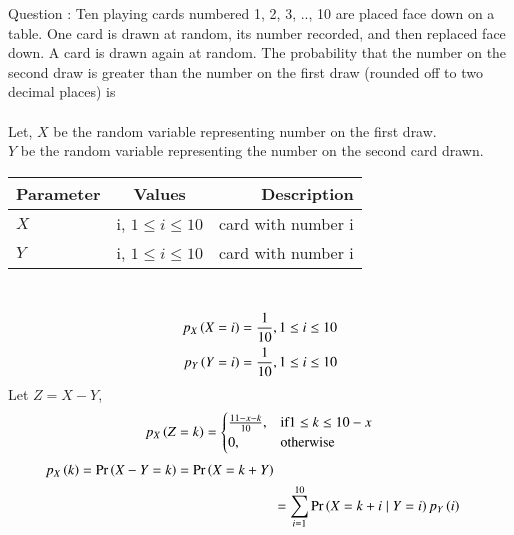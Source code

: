 \documentclass[journal,12pt,onecolumn]{IEEEtran}
\theoremstyle{remark}
\begin{document}
\let\vec\mathbf




\vspace{3cm}



\bigskip

\renewcommand{\thefigure}{\theenumi}
\renewcommand{\thetable}{\theenumi}
Question : Ten playing cards numbered 1, 2, 3, .., 10 are placed face down on a table. One card is drawn at random, its number recorded, and then replaced face down. A card is drawn again at random. The probability that the number on the second draw is greater than the number on the first draw (rounded off to two decimal places) is\\
\solution\\
Let, $X$ be the random variable representing number on the first draw.\\
$Y$ be the random variable representing the number on the second card drawn.\\
\begin{table}[h!]
 \begin{center}
    \begin{tabular}{|l|c|r|}
    \hline
    Parameter & Values & Description\\
    \hline
    $X$ & i, $1 \le i \le 10$ & card with number i\\
    \hline
     $Y$ & i, $1 \le i \le 10$ & card with number i\\
    \hline
    \end{tabular}
    \end{center}
  \label{tab:BT/61} 
\end{table}\\
\begin{align}
p_X\left(X = i\right) = \frac{1}{10}, 1 \le i \le 10\\
p_Y\left(Y = i\right) = \frac{1}{10}, 1 \le i \le 10
\end{align}
Let $Z = X-Y$,
\begin{align}
p_X\left(Z = k\right) = 
                \begin{cases}
		\frac{11-x-k}{10} , & \text{if} 1 \le k \le 10-x\\ 
		0, & \text{otherwise}
	\end{cases}
\end{align}
\begin{align}
p_X\left(k\right) = \Pr\left(X - Y = k\right) = \Pr\left(X = k + Y\right)\\
           &= \sum_{i=1}^{10}\Pr\left(X = k + i \mid Y = i\right) p_Y\left(i\right)
\end{align}
\end{document}
